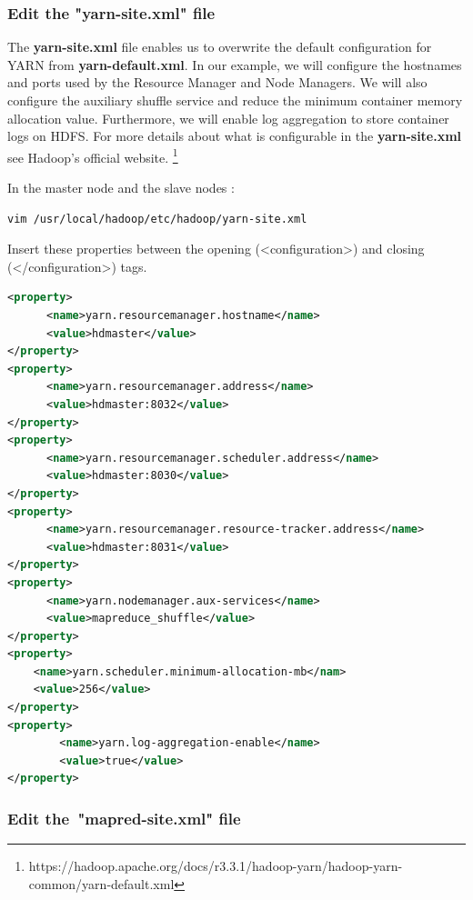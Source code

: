\documentclass[12pt,english]{book}
\begin{document}
\subsubsection{Edit the "yarn-site.xml" file}


The \textbf{yarn-site.xml} file enables us to overwrite the default configuration for YARN from \textbf{yarn-default.xml}.
In our example, we will configure the hostnames and ports used by the Resource Manager and Node Managers.
We will also configure the auxiliary shuffle service and reduce the minimum container memory allocation value.
Furthermore, we will enable log aggregation to store container logs on HDFS.
For more details about what is configurable in the \textbf{yarn-site.xml} see Hadoop's official website.
\footnote{https://hadoop.apache.org/docs/r3.3.1/hadoop-yarn/hadoop-yarn-common/yarn-default.xml}

In the master node and the slave nodes :
\begin{lstlisting}[language=bash, frame=single, basicstyle=\footnotesize]
vim /usr/local/hadoop/etc/hadoop/yarn-site.xml 
\end{lstlisting}
Insert these properties between the opening (<configuration>) and closing (</configuration>) tags. 
\begin{lstlisting}[language=xml, frame=single, basicstyle=\footnotesize]
<property>
      <name>yarn.resourcemanager.hostname</name>
      <value>hdmaster</value>
</property>
<property>
      <name>yarn.resourcemanager.address</name>
      <value>hdmaster:8032</value>
</property>
<property>
      <name>yarn.resourcemanager.scheduler.address</name>
      <value>hdmaster:8030</value>
</property>
<property>
      <name>yarn.resourcemanager.resource-tracker.address</name>
      <value>hdmaster:8031</value>
</property>
<property>
      <name>yarn.nodemanager.aux-services</name>
      <value>mapreduce_shuffle</value>
</property>
<property>
	<name>yarn.scheduler.minimum-allocation-mb</nam>
	<value>256</value>
</property>
<property>
        <name>yarn.log-aggregation-enable</name>
        <value>true</value>
</property>
\end{lstlisting}


\subsubsection{Edit the "mapred-site.xml" file}
\end{document}
